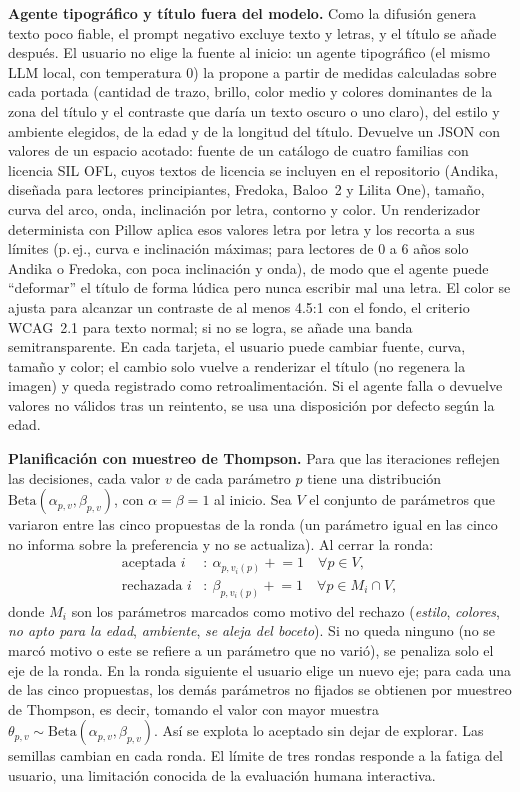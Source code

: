 \documentclass[10pt,a4paper,twocolumn]{article}
\begin{document}
\textbf{Agente tipográfico y título fuera del modelo.} Como la difusión genera texto poco fiable, el prompt negativo excluye texto y letras, y el título se añade después. El usuario no elige la fuente al inicio: un agente tipográfico (el mismo LLM local, con temperatura 0) la propone a partir de medidas calculadas sobre cada portada (cantidad de trazo, brillo, color medio y colores dominantes de la zona del título y el contraste que daría un texto oscuro o uno claro), del estilo y ambiente elegidos, de la edad y de la longitud del título. Devuelve un JSON con valores de un espacio acotado: fuente de un catálogo de cuatro familias con licencia SIL OFL, cuyos textos de licencia se incluyen en el repositorio (Andika, diseñada para lectores principiantes, Fredoka, Baloo~2 y Lilita One), tamaño, curva del arco, onda, inclinación por letra, contorno y color. Un renderizador determinista con Pillow aplica esos valores letra por letra y los recorta a sus límites (p.\,ej., curva e inclinación máximas; para lectores de 0 a 6 años solo Andika o Fredoka, con poca inclinación y onda), de modo que el agente puede ``deformar'' el título de forma lúdica pero nunca escribir mal una letra. El color se ajusta para alcanzar un contraste de al menos 4.5:1 con el fondo, el criterio WCAG~2.1 para texto normal; si no se logra, se añade una banda semitransparente. En cada tarjeta, el usuario puede cambiar fuente, curva, tamaño y color; el cambio solo vuelve a renderizar el título (no regenera la imagen) y queda registrado como retroalimentación. Si el agente falla o devuelve valores no válidos tras un reintento, se usa una disposición por defecto según la edad.

\textbf{Planificación con muestreo de Thompson.} Para que las iteraciones reflejen las decisiones, cada valor $v$ de cada parámetro $p$ tiene una distribución $\mathrm{Beta}(\alpha_{p,v},\beta_{p,v})$, con $\alpha=\beta=1$ al inicio. Sea $V$ el conjunto de parámetros que variaron entre las cinco propuestas de la ronda (un parámetro igual en las cinco no informa sobre la preferencia y no se actualiza). Al cerrar la ronda:
\begin{equation}
\begin{aligned}
\text{aceptada } i &: \ \alpha_{p,v_i(p)} \mathrel{+}= 1 \quad \forall p\in V,\\
\text{rechazada } i &: \ \beta_{p,v_i(p)} \mathrel{+}= 1 \quad \forall p\in M_i\cap V,
\end{aligned}
\end{equation}
donde $M_i$ son los parámetros marcados como motivo del rechazo (\emph{estilo}, \emph{colores}, \emph{no apto para la edad}, \emph{ambiente}, \emph{se aleja del boceto}). Si no queda ninguno (no se marcó motivo o este se refiere a un parámetro que no varió), se penaliza solo el eje de la ronda. En la ronda siguiente el usuario elige un nuevo eje; para cada una de las cinco propuestas, los demás parámetros no fijados se obtienen por muestreo de Thompson, es decir, tomando el valor con mayor muestra $\theta_{p,v}\sim\mathrm{Beta}(\alpha_{p,v},\beta_{p,v})$. Así se explota lo aceptado sin dejar de explorar. Las semillas cambian en cada ronda. El límite de tres rondas responde a la fatiga del usuario, una limitación conocida de la evaluación humana interactiva.
\end{document}
